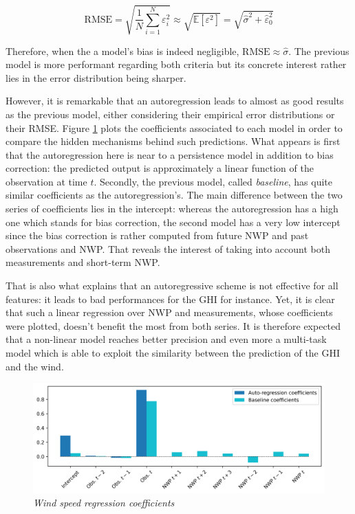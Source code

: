 \documentclass{article}
\newcommand{\saut}{\vspace{10px}}
\begin{document}
\[
	\mathrm{RMSE} = \sqrt{\frac{1}{N} \sum_{i = 1}^N \varepsilon^2_i} \approx \sqrt{ \mathbb E [\varepsilon^2] }
	= \sqrt{\hat \sigma^2 + \hat \varepsilon^2_0}
\]

Therefore, when the a model's bias is indeed negligible, $\mathrm{RMSE} \approx \hat \sigma$.
The previous model is more performant regarding both criteria but its concrete interest
rather lies in the error distribution being sharper.

\saut

However, it is remarkable that an autoregression leads to almost as good results as the previous model, either
considering their empirical error distributions or their RMSE. Figure \ref{fig:Fig. 6} plots the coefficients associated to
each model in order to compare the hidden mechanisms behind such predictions. What appears is first that
the autoregression here is near to a persistence model in addition to bias correction: the predicted output is
approximately a linear function of the observation at time $t$. Secondly, the previous model, called \emph{baseline},
has quite similar coefficients as the autoregression's. The main difference between the two series of coefficients
lies in the intercept: whereas the autoregression has a high one which stands for bias correction, the second model
has a very low intercept since the bias correction is rather computed from future NWP and past observations and NWP.
That reveals the interest of taking into account both measurements and short-term NWP.

\saut

That is also what explains that an autoregressive scheme
is not effective for all features: it leads to bad performances for the GHI
for instance. Yet, it is clear that such a linear regression over NWP and measurements, whose coefficients were
plotted, doesn't benefit the most from both series. It is therefore expected that a non-linear model reaches
better precision and even more a multi-task model which is able to exploit the similarity between the prediction of
the GHI and the wind.


\begin{figure}[H]
    \centering
    \includegraphics[width=\linewidth]{img/coef.png}
    \caption{\textit{Wind speed regression coefficients}}
    \label{fig:Fig. 6}
\end{figure}
\end{document}
